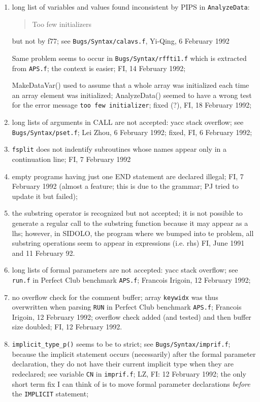 \begin{enumerate}
  \item long list of variables and values found inconsistent by PIPS in
	\verb+AnalyzeData+:
	\begin{quote}
	Too few initializers
	\end{quote}
	but not by f77; see \verb+Bugs/Syntax/calavs.f+, Yi-Qing,
	6 February 1992

	Same problem seems to occur in \verb+Bugs/Syntax/rffti1.f+ which
	is extracted from \verb+APS.f+; the context is easier;
	FI, 14 February 1992;

	MakeDataVar() used to assume that a whole array was initialized
	each time an array element was initialized; AnalyzeData() seemed
	to have a wrong test for the error message \verb+too few initializer+;
	fixed (?), FI, 18 February 1992;

  \item long lists of arguments in CALL are not accepted: yacc stack overflow;
	see \verb+Bugs/Syntax/pset.f+; Lei Zhou, 6 February 1992;
	fixed, FI, 6 February 1992;

  \item \verb+fsplit+ does not indentify subroutines whose names appear
	only in a continuation line; FI, 7 February 1992

  \item empty programs having just one END statement are declared illegal;
	FI, 7 February 1992 (almost a feature; this is due to the grammar;
	PJ tried to update it but failed);

  \item the substring operator is recognized but not accepted; it is not
	possible to generate a regular call to the substring function
	because it may appear as a lhs; however, in SIDOLO, the program
	where we bumped into te problem, all substring operations seem
	to appear in expressions (i.e. rhs)
	FI, June 1991 and 11 February 92.

  \item long lists of formal parameters are not accepted: yacc stack overflow;
	see \verb+run.f+ in Perfect Club benchmark \verb+APS.f+;
	Francois Irigoin, 12 February 1992; 

  \item no overflow check for the comment buffer; array \verb+keywidx+ was thus
	overwritten when parsing \verb+RUN+ in 
	Perfect Club benchmark \verb+APS.f+; Francois Irigoin, 12
	February 1992; overflow check added (and tested) and then
	buffer size doubled; FI, 12 February 1992.

  \item \verb+implicit_type_p()+ seems to be to strict; 
	see \verb+Bugs/Syntax/imprif.f+; because the implicit statement
	occurs (necessarily) after the formal parameter declaration, they
	do not have their current implicit type when they are redeclared;
	see variable \verb+CN+ in \verb+imprif.f+; LZ, FI: 12 February 1992;
	the only short term fix I can think of is to move formal parameter
	declarations {\em before} the \verb+IMPLICIT+ statement;


\end{enumerate}

